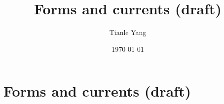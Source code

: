 \documentclass{noteformyself}
\title{Forms and currents (draft)}
\author{Tianle Yang}
\date{\today}
\begin{document}
    \maketitle
    \section{Forms and currents (draft)}




\end{document}
